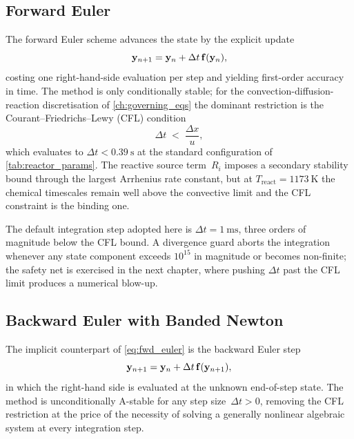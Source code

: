 \subsection{Forward Euler}\label{ssec:forward_euler}

The forward Euler scheme advances the state by the explicit update
\begin{equation}
  \mathbf{y}_{n+1} = \mathbf{y}_n + \Delta t\,\mathbf{f}(\mathbf{y}_n),
  \label{eq:fwd_euler}
\end{equation}
costing one right-hand-side evaluation per step and yielding first-order accuracy in time. The method is only conditionally stable; for the convection-diffusion-reaction discretisation of \cref{ch:governing_eqs} the dominant restriction is the Courant--Friedrichs--Lewy (CFL) condition
\begin{equation}
  \Delta t \;<\; \frac{\Delta x}{u},
  \label{eq:cfl}
\end{equation}
which evaluates to \(\Delta t < \SI{0.39}{\second}\) at the standard configuration of \cref{tab:reactor_params}. The reactive source term~\(R_i\) imposes a secondary stability bound through the largest Arrhenius rate constant, but at \(T_{\mathrm{react}} = \SI{1173}{\kelvin}\) the chemical timescales remain well above the convective limit and the CFL constraint is the binding one.

The default integration step adopted here is \(\Delta t = \SI{1}{\milli\second}\), three orders of magnitude below the CFL bound. A divergence guard aborts the integration whenever any state component exceeds \(10^{15}\) in magnitude or becomes non-finite; the safety net is exercised in the next chapter, where pushing \(\Delta t\) past the CFL limit produces a numerical blow-up.

\subsection{Backward Euler with Banded Newton}\label{ssec:backward_euler}

The implicit counterpart of \cref{eq:fwd_euler} is the backward Euler step
\begin{equation}
  \mathbf{y}_{n+1} = \mathbf{y}_n + \Delta t\,\mathbf{f}(\mathbf{y}_{n+1}),
  \label{eq:bwd_euler}
\end{equation}
in which the right-hand side is evaluated at the unknown end-of-step state. The method is unconditionally A-stable for any step size~\(\Delta t > 0\), removing the CFL restriction at the price of the necessity of solving a generally nonlinear algebraic system at every integration step.

